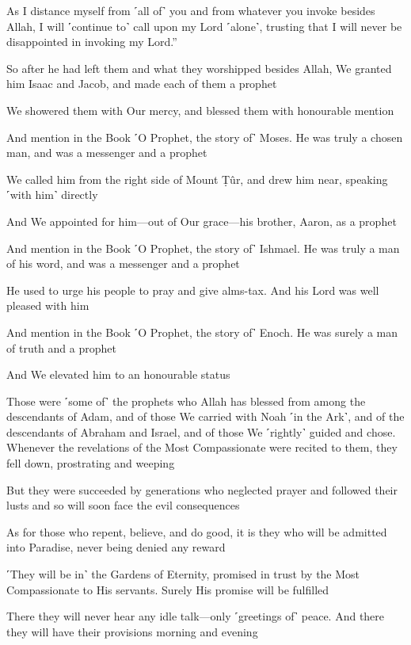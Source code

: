 As I distance myself from ˹all of˺ you and from whatever you invoke besides Allah, I will ˹continue to˺ call upon my Lord ˹alone˺, trusting that I will never be disappointed in invoking my Lord.”

So after he had left them and what they worshipped besides Allah, We granted him Isaac and Jacob, and made each of them a prophet

We showered them with Our mercy, and blessed them with honourable mention

And mention in the Book ˹O Prophet, the story of˺ Moses. He was truly a chosen man, and was a messenger and a prophet

We called him from the right side of Mount Ṭûr, and drew him near, speaking ˹with him˺ directly

And We appointed for him—out of Our grace—his brother, Aaron, as a prophet

And mention in the Book ˹O Prophet, the story of˺ Ishmael. He was truly a man of his word, and was a messenger and a prophet

He used to urge his people to pray and give alms-tax. And his Lord was well pleased with him

And mention in the Book ˹O Prophet, the story of˺ Enoch. He was surely a man of truth and a prophet

And We elevated him to an honourable status

Those were ˹some of˺ the prophets who Allah has blessed from among the descendants of Adam, and of those We carried with Noah ˹in the Ark˺, and of the descendants of Abraham and Israel, and of those We ˹rightly˺ guided and chose. Whenever the revelations of the Most Compassionate were recited to them, they fell down, prostrating and weeping

But they were succeeded by generations who neglected prayer and followed their lusts and so will soon face the evil consequences

As for those who repent, believe, and do good, it is they who will be admitted into Paradise, never being denied any reward

˹They will be in˺ the Gardens of Eternity, promised in trust by the Most Compassionate to His servants. Surely His promise will be fulfilled

There they will never hear any idle talk—only ˹greetings of˺ peace. And there they will have their provisions morning and evening

